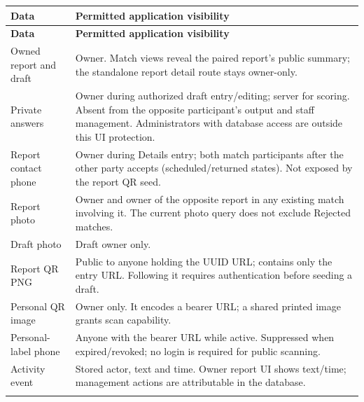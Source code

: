 \documentclass[12pt,a4paper,oneside]{report}
\begin{document}
\begin{longtable}{@{}P{0.26\dimexpr\textwidth-12pt\relax}P{0.74\dimexpr\textwidth-12pt\relax}@{}}

\toprule \textbf{Data} & \textbf{Permitted application visibility} \\ \midrule\endfirsthead

\toprule \textbf{Data} & \textbf{Permitted application visibility} \\ \midrule\endhead

\bottomrule\endfoot

Owned report and draft & Owner. Match views reveal the paired report's public summary; the standalone report detail route stays owner-only. \\ \addlinespace[3pt]

Private answers & Owner during authorized draft entry/editing; server for scoring. Absent from the opposite participant's output and staff management. Administrators with database access are outside this UI protection. \\ \addlinespace[3pt]

Report contact phone & Owner during Details entry; both match participants after the other party accepts (scheduled/returned states). Not exposed by the report QR seed. \\ \addlinespace[3pt]

Report photo & Owner and owner of the opposite report in any existing match involving it. The current photo query does not exclude Rejected matches. \\ \addlinespace[3pt]

Draft photo & Draft owner only. \\ \addlinespace[3pt]

Report QR PNG & Public to anyone holding the UUID URL; contains only the entry URL. Following it requires authentication before seeding a draft. \\ \addlinespace[3pt]

Personal QR image & Owner only. It encodes a bearer URL; a shared printed image grants scan capability. \\ \addlinespace[3pt]

Personal-label phone & Anyone with the bearer URL while active. Suppressed when expired/revoked; no login is required for public scanning. \\ \addlinespace[3pt]

Activity event & Stored actor, text and time. Owner report UI shows text/time; management actions are attributable in the database. \\ \addlinespace[3pt]

\end{longtable}
\end{document}
